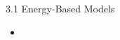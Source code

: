 \begin{frame}{3.1 Energy-Based Models}
    \begin{itemize}
        \item
    \end{itemize}
\end{frame}
